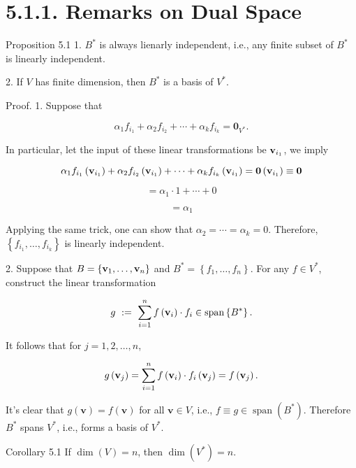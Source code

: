 \documentclass[11pt]{article}
\begin{document}
\section*{5.1.1. Remarks on Dual Space}

Proposition 5.1 1. \({B}^{ * }\) is always lienarly independent, i.e., any finite subset of \({B}^{ * }\) is linearly independent.

2. If \(V\) has finite dimension, then \({B}^{ * }\) is a basis of \({V}^{ * }\).

Proof. 1. Suppose that

\[
\alpha_1{f}_{{i}_1} + \alpha_2{f}_{{i}_2} + \cdots  + \alpha_{k}{f}_{{i}_{k}} = {\mathbf{0}}_{{V}^{ * }}.
\]

In particular, let the input of these linear transformations be \({\bf v}_{{i}_1}\), we imply

\[
\alpha_1{f}_{{i}_1}\left( {\bf v}_{{i}_1}\right)  + \alpha_2{f}_{{i}_2}\left( {\bf v}_{{i}_1}\right)  + \cdots  + \alpha_{k}{f}_{{i}_{k}}\left( {\bf v}_{{i}_1}\right)  = \mathbf{0}\left( {\bf v}_{{i}_1}\right)  \equiv  \mathbf{0}
\]

\[
= \alpha_1 \cdot  1 + \cdots  + 0
\]

\[
= \alpha_1
\]

Applying the same trick, one can show that \(\alpha_2 = \cdots  = \alpha_{k} = 0\). Therefore, \(\left\{  {{f}_{{i}_1},\ldots ,{f}_{{i}_{k}}}\right\}\) is linearly independent.

2. Suppose that \(B = \left\{  {{\bf v}_1,\ldots ,{\bf v}_n}\right\}\) and \({B}^{ * } = \left\{  {{f}_1,\ldots ,{f}_n}\right\}\). For any \(f \in  {V}^{ * }\), construct the linear transformation

\[
g \mathrel{\text{ := }} \mathop{\sum }\limits_{{i = 1}}^nf\left( {\bf v}_{i}\right)  \cdot  {f}_{i} \in  \operatorname{span}\left\{  {B}^{ * }\right\}  .
\]

It follows that for \(j = 1,2,\ldots ,n\),

\[
g\left( {\bf v}_{j}\right)  = \mathop{\sum }\limits_{{i = 1}}^nf\left( {\bf v}_{i}\right)  \cdot  {f}_{i}\left( {\bf v}_{j}\right)  = f\left( {\bf v}_{j}\right) .
\]

It’s clear that \(g\left( \mathbf{v}\right)  = f\left( \mathbf{v}\right)\) for all \(\mathbf{v} \in  V\), i.e., \(f \equiv  g \in  \operatorname{span}\left( {B}^{ * }\right)\). Therefore \({B}^{ * }\) spans \({V}^{ * }\), i.e., forms a basis of \({V}^{ * }\).

Corollary 5.1 If \(\dim \left( V\right)  = n\), then \(\dim \left( {V}^{ * }\right)  = n\).
\end{document}
